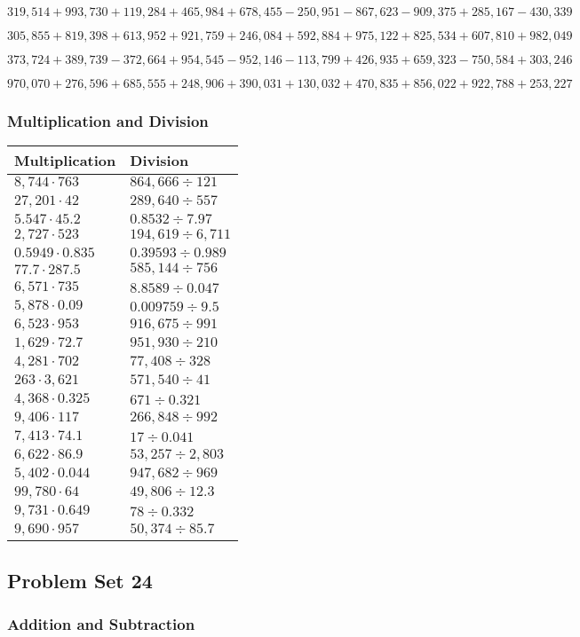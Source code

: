 \(319,514+993,730+119,284+465,984+678,455-250,951-867,623-909,375+285,167-430,339\)

\(305,855+819,398+613,952+921,759+246,084+592,884+975,122+825,534+607,810+982,049\)

\(373,724+389,739-372,664+954,545-952,146-113,799+426,935+659,323-750,584+303,246\)

\(970,070+276,596+685,555+248,906+390,031+130,032+470,835+856,022+922,788+253,227\)

\hypertarget{multiplication-and-division-327}{%
\subsubsection{Multiplication and
Division}\label{multiplication-and-division-327}}

\begin{longtable}[]{@{}ll@{}}
\toprule
Multiplication & Division\tabularnewline
\midrule
\endhead
\(8,744\cdot763\) & \(864,666÷121\)\tabularnewline
\(27,201\cdot42\) & \(289,640÷557\)\tabularnewline
\(5.547\cdot45.2\) & \(0.8532÷7.97\)\tabularnewline
\(2,727\cdot523\) & \(194,619÷6,711\)\tabularnewline
\(0.5949\cdot0.835\) & \(0.39593÷0.989\)\tabularnewline
\(77.7\cdot287.5\) & \(585,144÷756\)\tabularnewline
\(6,571\cdot735\) & \(8.8589÷0.047\)\tabularnewline
\(5,878\cdot0.09\) & \(0.009759÷9.5\)\tabularnewline
\(6,523\cdot953\) & \(916,675÷991\)\tabularnewline
\(1,629\cdot72.7\) & \(951,930÷210\)\tabularnewline
\(4,281\cdot702\) & \(77,408÷328\)\tabularnewline
\(263\cdot3,621\) & \(571,540÷41\)\tabularnewline
\(4,368\cdot0.325\) & \(671÷0.321\)\tabularnewline
\(9,406\cdot117\) & \(266,848÷992\)\tabularnewline
\(7,413\cdot74.1\) & \(17÷0.041\)\tabularnewline
\(6,622\cdot86.9\) & \(53,257÷2,803\)\tabularnewline
\(5,402\cdot0.044\) & \(947,682÷969\)\tabularnewline
\(99,780\cdot64\) & \(49,806÷12.3\)\tabularnewline
\(9,731\cdot0.649\) & \(78÷0.332\)\tabularnewline
\(9,690\cdot957\) & \(50,374÷85.7\)\tabularnewline
\bottomrule
\end{longtable}

\hypertarget{problem-set-24-5}{%
\subsection{Problem Set 24}\label{problem-set-24-5}}

\hypertarget{addition-and-subtraction-329}{%
\subsubsection{Addition and
Subtraction}\label{addition-and-subtraction-329}}

